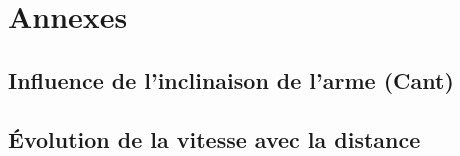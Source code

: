 
\chapter*{}

\cleardoublepage
{}
\renewcommand{\CurrentPartColor}{AnnexColor}
\renewcommand{\CurrentPartNumber}{Annexes}
\renewcommand{\CurrentPartName}{Annexes}
\renewcommand{\CurrentChapterType}{Annexe}


\appendix
\part{Annexes}

    \chapter{Influence de l'inclinaison de l'arme (Cant)}
    \label{chap:rotation_arme}
    

    \chapter{Évolution de la vitesse avec la distance}
    \label{chap:evolution_vitesse}
    
